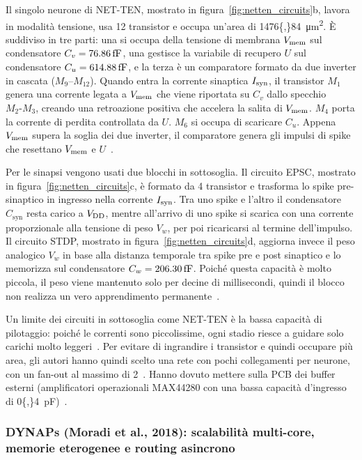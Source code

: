 Il singolo neurone di NET-TEN, mostrato in figura~\ref{fig:netten_circuits}b, lavora in modalità tensione, usa 12 transistor e occupa un'area di \SI{1476{,}84}{\micro\meter\squared}. È suddiviso in tre parti: una si occupa della tensione di membrana $V_{\mathrm{mem}}$ sul condensatore $C_v = \SI{76{,}86}{\femto\farad}$, una gestisce la variabile di recupero $U$ sul condensatore $C_u = \SI{614{,}88}{\femto\farad}$, e la terza è un comparatore formato da due inverter in cascata ($M_9\text{--}M_{12}$). Quando entra la corrente sinaptica $I_{\mathrm{syn}}$, il transistor $M_1$ genera una corrente legata a $V_{\mathrm{mem}}$ che viene riportata su $C_v$ dallo specchio $M_2\text{-}M_3$, creando una retroazione positiva che accelera la salita di $V_{\mathrm{mem}}$. $M_4$ porta la corrente di perdita controllata da $U$. $M_6$ si occupa di scaricare $C_u$. Appena $V_{\mathrm{mem}}$ supera la soglia dei due inverter, il comparatore genera gli impulsi di spike che resettano $V_{\mathrm{mem}}$ e $U$~\cite{ronchini2023}.

Per le sinapsi vengono usati due blocchi in sottosoglia. Il circuito EPSC, mostrato in figura~\ref{fig:netten_circuits}c, è formato da 4 transistor e trasforma lo spike pre-sinaptico in ingresso nella corrente $I_{\mathrm{syn}}$. Tra uno spike e l'altro il condensatore $C_{\mathrm{syn}}$ resta carico a $V_{\mathrm{DD}}$, mentre all'arrivo di uno spike si scarica con una corrente proporzionale alla tensione di peso $V_w$, per poi ricaricarsi al termine dell'impulso. Il circuito STDP, mostrato in figura~\ref{fig:netten_circuits}d, aggiorna invece il peso analogico $V_w$ in base alla distanza temporale tra spike pre e post sinaptico e lo memorizza sul condensatore $C_w = \SI{206{,}30}{\femto\farad}$. Poiché questa capacità è molto piccola, il peso viene mantenuto solo per decine di millisecondi, quindi il blocco non realizza un vero apprendimento permanente~\cite{ronchini2023}.

Un limite dei circuiti in sottosoglia come NET-TEN è la bassa capacità di pilotaggio: poiché le correnti sono piccolissime, ogni stadio riesce a guidare solo carichi molto leggeri~\cite{ronchini2023}. Per evitare di ingrandire i transistor e quindi occupare più area, gli autori hanno quindi scelto una rete con pochi collegamenti per neurone, con un fan-out al massimo di 2~\cite{ronchini2023}. Hanno dovuto mettere sulla PCB dei buffer esterni (amplificatori operazionali MAX44280 con una bassa capacità d'ingresso di \SI{0{,}4}{\pico\farad})~\cite{ronchini2023}.

\subsubsection{DYNAPs (Moradi et al., 2018): scalabilità multi-core, memorie eterogenee e routing asincrono}
\label{subsec:dynaps_cmos}

